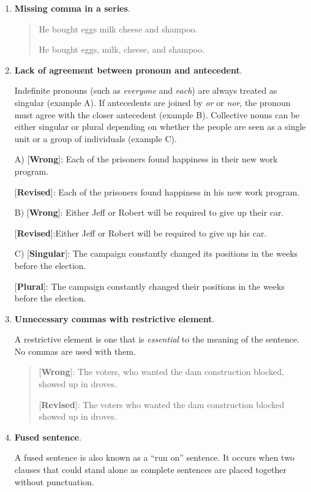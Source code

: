 \begin{enumerate}
\item \textbf{Missing comma in a series}.
\begin{quote}
He bought eggs milk cheese and shampoo.      

He bought eggs, milk, cheese, and shampoo.      
\end{quote}

\item \textbf{Lack of agreement between pronoun and antecedent}.

Indefinite pronouns (such as \emph{everyone} and \emph{each}) are always treated as singular (example A). If antecedents are joined by \emph{or} or \emph{nor}, the pronoun must agree with the closer antecedent (example B). Collective nouns can be either singular or plural depending on whether the people are seen as a single unit or a group of individuals (example C).


A) [\textbf{Wrong}]: Each of the prisoners found happiness in their new work program. 

[\textbf{Revised}]: Each of the prisoners found happiness in his new work program. 


B) [\textbf{Wrong}]: Either Jeff or Robert will be required to give up their car. 

[\textbf{Revised}]:Either Jeff or Robert will be required to give up his car. 
\medskip

C) [\textbf{Singular}]: The campaign constantly changed its positions in the weeks before the election. 

[\textbf{Plural}]: The campaign constantly changed their positions in the weeks before the election. 


\item \textbf{Unnecessary commas with restrictive element}.

A restrictive element is one that is \emph{essential} to the meaning of the sentence. No commas are used with them. 

\begin{quote}
[\textbf{Wrong}]: The voters, who wanted the dam construction blocked, showed up in droves.

 [\textbf{Revised}]: The voters who wanted the dam construction blocked showed up in droves.
\end{quote}

\item \textbf{Fused sentence}.

A fused sentence is also known as a ``run on'' sentence. It occurs when two clauses that could stand alone as complete sentences are placed together without punctuation.
 

\end{enumerate}
